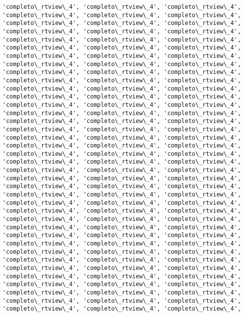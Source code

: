 \documentclass[11pt]{article}
\begin{document}
\begin{Verbatim}[commandchars=\\\{\}]
'completo\_rtview\_4', 'completo\_rtview\_4', 'completo\_rtview\_4',
'completo\_rtview\_4', 'completo\_rtview\_4', 'completo\_rtview\_4',
'completo\_rtview\_4', 'completo\_rtview\_4', 'completo\_rtview\_4',
'completo\_rtview\_4', 'completo\_rtview\_4', 'completo\_rtview\_4',
'completo\_rtview\_4', 'completo\_rtview\_4', 'completo\_rtview\_4',
'completo\_rtview\_4', 'completo\_rtview\_4', 'completo\_rtview\_4',
'completo\_rtview\_4', 'completo\_rtview\_4', 'completo\_rtview\_4',
'completo\_rtview\_4', 'completo\_rtview\_4', 'completo\_rtview\_4',
'completo\_rtview\_4', 'completo\_rtview\_4', 'completo\_rtview\_4',
'completo\_rtview\_4', 'completo\_rtview\_4', 'completo\_rtview\_4',
'completo\_rtview\_4', 'completo\_rtview\_4', 'completo\_rtview\_4',
'completo\_rtview\_4', 'completo\_rtview\_4', 'completo\_rtview\_4',
'completo\_rtview\_4', 'completo\_rtview\_4', 'completo\_rtview\_4',
'completo\_rtview\_4', 'completo\_rtview\_4', 'completo\_rtview\_4',
'completo\_rtview\_4', 'completo\_rtview\_4', 'completo\_rtview\_4',
'completo\_rtview\_4', 'completo\_rtview\_4', 'completo\_rtview\_4',
'completo\_rtview\_4', 'completo\_rtview\_4', 'completo\_rtview\_4',
'completo\_rtview\_4', 'completo\_rtview\_4', 'completo\_rtview\_4',
'completo\_rtview\_4', 'completo\_rtview\_4', 'completo\_rtview\_4',
'completo\_rtview\_4', 'completo\_rtview\_4', 'completo\_rtview\_4',
'completo\_rtview\_4', 'completo\_rtview\_4', 'completo\_rtview\_4',
'completo\_rtview\_4', 'completo\_rtview\_4', 'completo\_rtview\_4',
'completo\_rtview\_4', 'completo\_rtview\_4', 'completo\_rtview\_4',
'completo\_rtview\_4', 'completo\_rtview\_4', 'completo\_rtview\_4',
'completo\_rtview\_4', 'completo\_rtview\_4', 'completo\_rtview\_4',
'completo\_rtview\_4', 'completo\_rtview\_4', 'completo\_rtview\_4',
'completo\_rtview\_4', 'completo\_rtview\_4', 'completo\_rtview\_4',
'completo\_rtview\_4', 'completo\_rtview\_4', 'completo\_rtview\_4',
'completo\_rtview\_4', 'completo\_rtview\_4', 'completo\_rtview\_4',
'completo\_rtview\_4', 'completo\_rtview\_4', 'completo\_rtview\_4',
'completo\_rtview\_4', 'completo\_rtview\_4', 'completo\_rtview\_4',
'completo\_rtview\_4', 'completo\_rtview\_4', 'completo\_rtview\_4',
'completo\_rtview\_4', 'completo\_rtview\_4', 'completo\_rtview\_4',
'completo\_rtview\_4', 'completo\_rtview\_4', 'completo\_rtview\_4',
'completo\_rtview\_4', 'completo\_rtview\_4', 'completo\_rtview\_4',
'completo\_rtview\_4', 'completo\_rtview\_4', 'completo\_rtview\_4',
'completo\_rtview\_4', 'completo\_rtview\_4', 'completo\_rtview\_4',
'completo\_rtview\_4', 'completo\_rtview\_4', 'completo\_rtview\_4',

\end{Verbatim}
\end{document}
